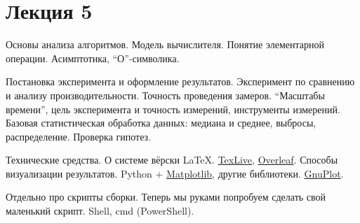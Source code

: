\section{Лекция 5}
 
Основы анализа алгоритмов. Модель вычислителя. Понятие элементарной операции. Асимптотика, ``О''-символика.

Постановка эксперимента и оформление результатов. Эксперимент по сравнению и анализу производительности. Точность проведения замеров. ``Масштабы времени'', цель эксперимента и точность измерений, инструменты измерений. Базовая статистическая обработка данных: медиана и среднее, выбросы, распределение. Проверка гипотез.  

Технические средства.
О системе вёрски \LaTeX. \href{https://www.tug.org/texlive/}{TexLive}, \href{https://www.overleaf.com/}{Overleaf}.
Способы визуализации результатов. Python + \href{https://matplotlib.org/3.3.1/index.html}{Matplotlib}, другие библиотеки. \href{http://www.gnuplot.info/}{GnuPlot}.  

Отдельно про скрипты сборки. Теперь мы руками попробуем сделать свой маленький скрипт. Shell, cmd (PowerShell).